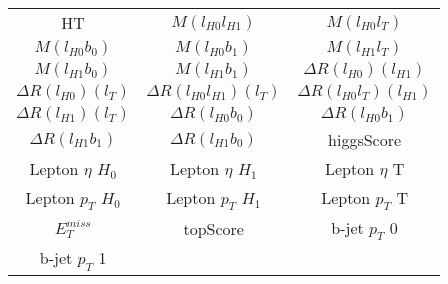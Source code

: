   \begin{center}
  \begin{tabular}{ccc}
    \hline\hline
    HT & $M(l_{H0}l_{H1})$ & $M(l_{H0}l_{T})$ \\
    $M(l_{H0}b_0)$ & $M(l_{H0}b_1)$ & $M(l_{H1}l_{T})$ \\
    $M(l_{H1}b_0)$ & $M(l_{H1}b_1)$ & $\Delta R(l_{H0})(l_{H1})$ \\
    $\Delta R(l_{H0})(l_{T})$ & $\Delta R(l_{H0}l_{H1})(l_{T})$ & $\Delta R(l_{H0}l_{T})(l_{H1})$ \\
    $\Delta R(l_{H1})(l_{T})$ & $\Delta R(l_{H0}b_0)$ & $\Delta R(l_{H0}b_1)$ \\
    $\Delta R(l_{H1}b_1)$ & $\Delta R(l_{H1}b_0)$ & higgsScore \\
    Lepton  $\eta$ $H_0$ & Lepton  $\eta$ $H_1$ & Lepton  $\eta$ T \\
    Lepton  $p_T$ $H_0$ & Lepton  $p_T$ $H_1$ & Lepton  $p_T$ T \\
    $E_T^{miss}$ & topScore & b-jet $p_T$ 0 \\
    b-jet $p_T$ 1 & & \\
    \hline
  \end{tabular}
  \end{center}

